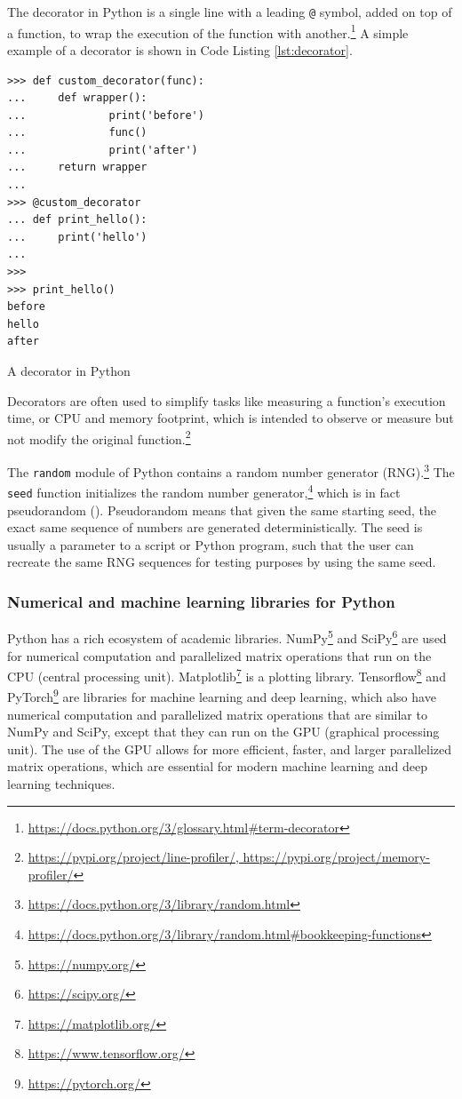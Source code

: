 \documentclass[report.tex]{subfiles}
\begin{document}
The decorator in Python is a single line with a leading \Verb#@# symbol, added on top of a function, to wrap the execution of the function with another.\footnote{\url{https://docs.python.org/3/glossary.html\#term-decorator}} A simple example of a decorator is shown in Code Listing \ref{lst:decorator}.

\begin{listing}[ht]
\centering
\begin{BVerbatim}
>>> def custom_decorator(func):
...     def wrapper():
...             print('before')
...             func()
...             print('after')
...     return wrapper
...
>>> @custom_decorator
... def print_hello():
...     print('hello')
...
>>>
>>> print_hello()
before
hello
after
\end{BVerbatim}
	\caption{A decorator in Python}
	\label{lst:decorator}
\end{listing}

Decorators are often used to simplify tasks like measuring a function's execution time, or CPU and memory footprint, which is intended to observe or measure but not modify the original function.\footnote{\url{https://pypi.org/project/line-profiler/, https://pypi.org/project/memory-profiler/}}

The \Verb#random# module of Python contains a random number generator (RNG).\footnote{\url{https://docs.python.org/3/library/random.html}} The \Verb#seed# function initializes the random number generator,\footnote{\url{https://docs.python.org/3/library/random.html\#bookkeeping-functions}} which is in fact pseudorandom (\cite{pseudorng}). Pseudorandom means that given the same starting seed, the exact same sequence of numbers are generated deterministically. The seed is usually a parameter to a script or Python program, such that the user can recreate the same RNG sequences for testing purposes by using the same seed.

\subsubsection{Numerical and machine learning libraries for Python}

Python has a rich ecosystem of academic libraries. NumPy\footnote{\url{https://numpy.org/}} and SciPy\footnote{\url{https://scipy.org/}} are used for numerical computation and parallelized matrix operations that run on the CPU (central processing unit). Matplotlib\footnote{\url{https://matplotlib.org/}} is a plotting library. Tensorflow\footnote{\url{https://www.tensorflow.org/}} and PyTorch\footnote{\url{https://pytorch.org/}} are libraries for machine learning and deep learning, which also have numerical computation and parallelized matrix operations that are similar to NumPy and SciPy, except that they can run on the GPU (graphical processing unit). The use of the GPU allows for more efficient, faster, and larger parallelized matrix operations, which are essential for modern machine learning and deep learning techniques.
\end{document}
